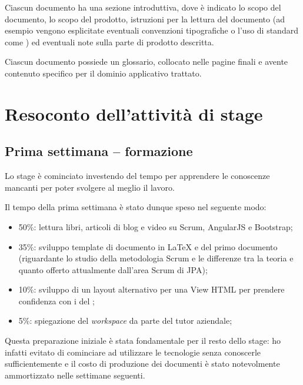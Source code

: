 Ciascun documento ha una sezione introduttiva, dove è indicato lo scopo del
documento, lo scopo del prodotto, istruzioni per la lettura del documento (ad
esempio vengono esplicitate eventuali convenzioni tipografiche o l'uso di
standard come ) ed eventuali note sulla parte di prodotto descritta.

Ciascun documento possiede un glossario, collocato nelle pagine finali e
avente contenuto specifico per il dominio applicativo trattato.

\section{Resoconto dell'attività di stage}

\subsection{Prima settimana -- formazione}

Lo stage è cominciato investendo del tempo per apprendere le conoscenze
mancanti per poter svolgere al meglio il lavoro.

Il tempo della prima settimana è stato dunque speso nel seguente modo:

\begin{itemize}
\item 50\%: lettura libri, articoli di blog e video su Scrum, AngularJS e
  Bootstrap;
\item 35\%: sviluppo template di documento in \LaTeX{} e del primo documento
  (riguardante lo studio della metodologia Scrum e le differenze tra la teoria
  e quanto offerto attualmente dall'area Scrum di JPA);
\item 10\%: sviluppo di un layout alternativo per una View HTML per prendere
  confidenza con i  del \FREND;
\item 5\%: spiegazione del \emph{workspace} da parte del tutor aziendale;
\end{itemize}

Questa preparazione iniziale è stata fondamentale per il resto dello stage: ho
infatti evitato di cominciare ad utilizzare le tecnologie senza conoscerle
sufficientemente e il costo di produzione dei documenti è stato notevolmente
ammortizzato nelle settimane seguenti.

